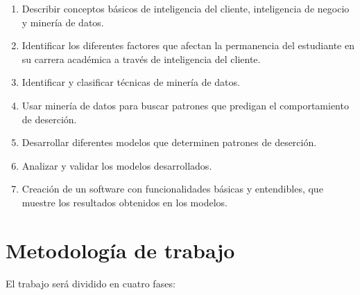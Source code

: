\begin{enumerate}
\item Describir conceptos básicos de inteligencia del cliente, inteligencia de negocio y minería de datos.
\item Identificar los diferentes factores que afectan la permanencia del estudiante en su carrera académica a través de inteligencia del cliente.
\item Identificar y clasificar técnicas de minería de datos.
\item Usar minería de datos para buscar patrones que predigan el comportamiento de deserción.
\item Desarrollar diferentes modelos que determinen patrones de deserción.
\item Analizar y validar los modelos desarrollados.
\item Creación de un software con funcionalidades básicas y entendibles, que muestre los resultados obtenidos en los modelos.
\end{enumerate}

\section{Metodología de trabajo}

El trabajo será dividido en cuatro fases:

